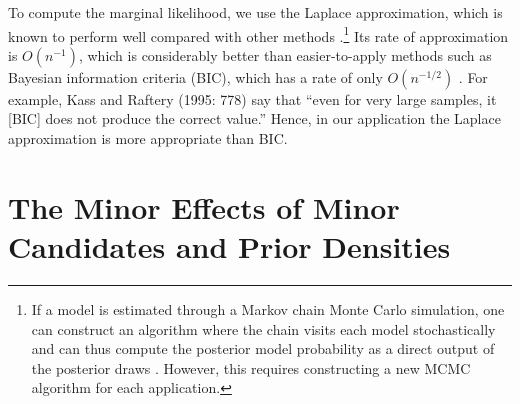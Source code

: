 \documentclass[11pt,titlepage]{article}
\renewcommand{\P}{\text{P}}
\begin{document}
To compute the marginal likelihood, we use the Laplace approximation,
which is known to perform well compared with other methods
\citep{raft:96,lewi:raft:97,dici:kass:raft:wass:97}.\footnote{If a
  model is estimated through a Markov chain Monte Carlo simulation,
  one can construct an algorithm where the chain visits each model
  stochastically and can thus compute the posterior model probability
  as a direct output of the posterior draws \citep{chib:95}.  However,
  this requires constructing a new MCMC algorithm for each
  application.}  Its rate of approximation is $O(n^{-1})$, which is
considerably better than easier-to-apply methods such as Bayesian
information criteria (BIC), which has a rate of only $O(n^{-1/2})$
\citep{kass:tier:kada:89}.  For example, Kass and Raftery (1995: 778)
say that ``even for very large samples, it [BIC] does not produce the
correct value.''  Hence, in our application the Laplace approximation
is more appropriate than BIC.

\vspace{-0.05in}

\section{The Minor Effects of Minor Candidates and Prior Densities}\label{a:sens}
\end{document}
